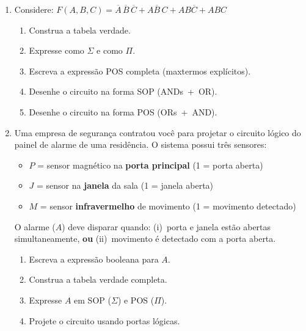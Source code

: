 \documentclass[11pt, a4paper]{article}
\begin{document}
\begin{enumerate}
\vfill

\item Considere: $F(A,B,C) = \overline{A}\,\overline{B}\,\overline{C} + A\overline{B}\,C + AB\overline{C} + ABC$
\begin{enumerate}
  \item Construa a tabela verdade.
  \item Expresse como $\Sigma$ e como $\Pi$.
  \item Escreva a express\~{a}o POS completa (maxtermos expl\'{i}citos).
  \item Desenhe o circuito na forma SOP (ANDs~+~OR).
  \item Desenhe o circuito na forma POS (ORs~+~AND).
\end{enumerate}

\vfill

\item Uma empresa de seguran\c{c}a contratou voc\^{e} para projetar o circuito l\'{o}gico do painel de alarme de uma resid\^{e}ncia. O sistema possui tr\^{e}s sensores:
\begin{itemize}
  \item $P$ = sensor magn\'{e}tico na \textbf{porta principal} (1 = porta aberta)
  \item $J$ = sensor na \textbf{janela} da sala (1 = janela aberta)
  \item $M$ = sensor \textbf{infravermelho} de movimento (1 = movimento detectado)
\end{itemize}
O alarme ($A$) deve disparar quando: (i)~porta e janela est\~{a}o abertas simultaneamente, \textbf{ou} (ii)~movimento \'{e} detectado com a porta aberta.
\begin{enumerate}
  \item Escreva a express\~{a}o booleana para $A$.
  \item Construa a tabela verdade completa.
  \item Expresse $A$ em SOP ($\Sigma$) e POS ($\Pi$).
  \item Projete o circuito usando portas l\'{o}gicas.
\end{enumerate}

\vfill


\end{enumerate}
\end{document}
